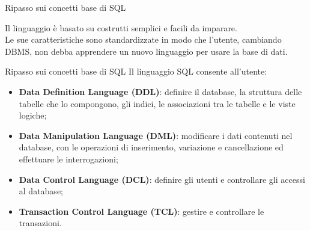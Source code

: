 \begin{frame}{Ripasso sui concetti base di SQL}
    
    \noindent Il linguaggio \`e basato su costrutti semplici e facili da imparare.
    \newline
    \\ Le sue caratteristiche sono standardizzate in modo che l'utente, cambiando DBMS, non debba apprendere un nuovo linguaggio per usare la base di dati.
\end{frame}
%
\begin{frame}{Ripasso sui concetti base di SQL}
    Il linguaggio SQL consente all'utente:
    \begin{itemize}[<+->]
        \item \textbf{Data Definition Language (DDL)}: definire il database, la struttura delle tabelle che lo compongono, gli indici, le associazioni tra le tabelle e le viste logiche;
        \item \textbf{Data Manipulation Language (DML)}: modificare i dati contenuti nel database, con le operazioni di inserimento, variazione e cancellazione ed effettuare le interrogazioni;
        \item \textbf{Data Control Language (DCL)}: definire gli utenti e controllare gli accessi al database;
        \item \textbf{Transaction Control Language (TCL)}: gestire e controllare le transazioni.
    \end{itemize}
\end{frame}